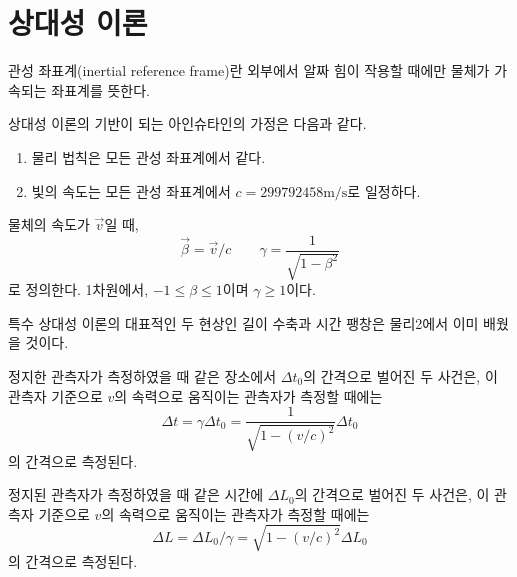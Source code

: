 \section{상대성 이론}
\begin{definition}[관성 좌표계]
관성 좌표계(inertial reference frame)란 외부에서 알짜 힘이 작용할 때에만 물체가 가속되는 좌표계를 뜻한다.
\end{definition}
\begin{theorem}
상대성 이론의 기반이 되는 아인슈타인의 가정은 다음과 같다.\\
\begin{enumerate}
\item 물리 법칙은 모든 관성 좌표계에서 같다.
\item 빛의 속도는 모든 관성 좌표계에서 $c=299792458\mathrm{m/s}$로 일정하다.
\end{enumerate}
\end{theorem}
\begin{definition}
물체의 속도가 $\vec{v}$일 때, 
\begin{equation}
\vec{\beta}=\vec{v}/c\quad\quad\gamma=\frac{1}{\sqrt{1-\beta^2}}
\end{equation}
로 정의한다. 1차원에서, $-1\le \beta \le 1$이며 $\gamma\ge 1$이다. 
\end{definition}
특수 상대성 이론의 대표적인 두 현상인 길이 수축과 시간 팽창은 물리2에서 이미 배웠을 것이다.

\begin{remark}
정지한 관측자가 측정하였을 때 같은 장소에서 $\Delta t_0$의 간격으로 벌어진 두 사건은, 이 관측자 기준으로 $v$의 속력으로 움직이는 관측자가 측정할 때에는
\begin{equation}
\Delta t = \gamma \Delta t_0=\frac{1}{\sqrt{1-(v/c)^2}}\Delta t_0
\end{equation}
의 간격으로 측정된다.
\end{remark}
\begin{remark}
정지된 관측자가 측정하였을 때 같은 시간에 $\Delta L_0$의 간격으로 벌어진 두 사건은, 이 관측자 기준으로 $v$의 속력으로 움직이는 관측자가 측정할 때에는
\begin{equation}
\Delta L = \Delta L_0 /\gamma = \sqrt{1-(v/c)^2}\Delta L_0
\end{equation}
의 간격으로 측정된다.
\end{remark}

